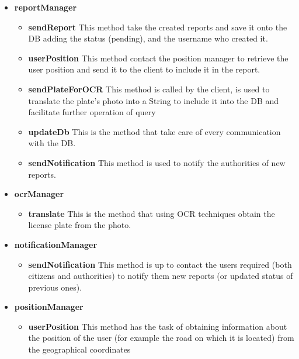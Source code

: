 \documentclass[12pt,a4paper]{report}
\begin{document}
				\begin{itemize}
					\item \textbf{reportManager}
					\begin{itemize}
						\item \textbf{sendReport} This method take the created reports and save it onto the DB adding
						the status (pending), and the username who created it.
						\item \textbf{userPosition} This method contact the position manager to retrieve the user
						position and send it to the client to include it in the report.
						\item \textbf{sendPlateForOCR} This method is called by the client, is used to translate the
						plate's photo into a String to include it into the DB and facilitate further operation of query
						\item \textbf{updateDb} This is the method that take care of every communication with the DB.
						\item \textbf{sendNotification} This method is used to notify the authorities of new reports.
					\end{itemize}
					\item \textbf{ocrManager}
					\begin{itemize}
						\item \textbf{translate} This is the method that using OCR techniques obtain the license plate
						from the photo.
					\end{itemize}
					\newpage \item \textbf{notificationManager}
					\begin{itemize}
						\item \textbf{sendNotification}  This method is up to contact the users required (both citizens
						and authorities) to notify them new reports (or updated status of previous ones).
					\end{itemize}
					\item \textbf{positionManager}
					\begin{itemize}
						\item \textbf{userPosition} This method has the task of obtaining information about the position of the
							user (for example the road on which it is located) from the geographical coordinates
					\end{itemize}
				\end{itemize}
\end{document}
